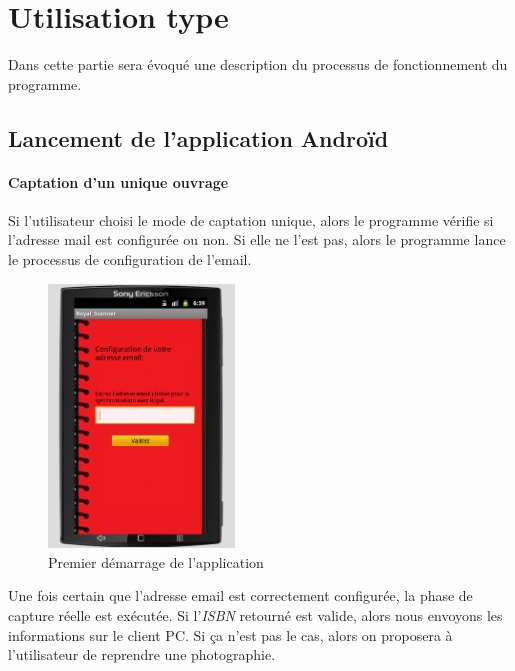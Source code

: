 \section{Utilisation type}
Dans cette partie sera évoqué une description du processus de fonctionnement du programme.

\subsection{Lancement de l'application Androïd}

\paragraph{Captation d'un unique ouvrage} 

Si l'utilisateur choisi le mode de captation unique, alors le programme vérifie si l'adresse mail est configurée ou non. 
Si elle ne l'est pas, alors le programme lance le processus de configuration de l'email. 

\begin{figure}
\begin{center}
\includegraphics[height=7cm]{../img/Royal_Scanner_configuepremiermail.png}
\end{center}
\caption{Premier démarrage de l'application}
\end{figure}

Une fois certain que l'adresse email est correctement configurée, la phase de capture réelle est exécutée. 
Si l'\emph{ISBN} retourné est valide, alors nous envoyons les informations sur le client PC. 
Si ça n'est pas le cas, alors on proposera à l'utilisateur de reprendre une photographie. 

